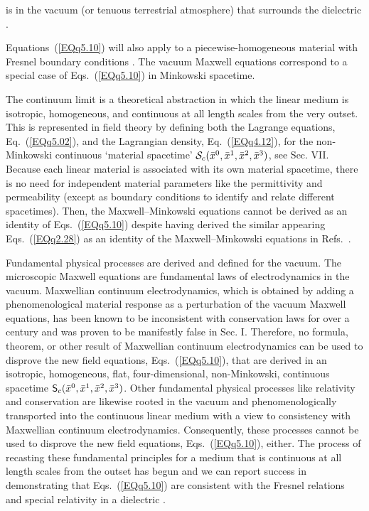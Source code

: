 \documentclass[twocolumn,amssymb,eqsecnum,aps,pra]{revtex4-2}
\begin{document}
is in the vacuum (or tenuous terrestrial atmosphere) that
surrounds the dielectric \cite{BIAJP}.
\par
Equations~(\ref{EQq5.10}) will also apply to a piecewise-homogeneous
material with Fresnel boundary conditions \cite{BINewFres}.
The vacuum Maxwell equations correspond to a special case of
Eqs.~(\ref{EQq5.10}) in Minkowski spacetime.
\par
The continuum limit is a theoretical abstraction in which the linear
medium is isotropic, homogeneous, and continuous at all length scales
from the very outset.
This is represented in field theory by defining both the Lagrange
equations, Eq.~(\ref{EQq5.02}), and the Lagrangian density,
Eq.~(\ref{EQq4.12}), for the non-Minkowski continuous
`material spacetime' ${\cal S}_c(\bar x^0,\bar x^1,\bar x^2,\bar x^3)$,
see Sec. VII.
Because each linear material is associated with its own material 
spacetime, there is no need for independent material parameters
like the permittivity and permeability (except as boundary conditions
to identify and relate different spacetimes).
Then, the Maxwell--Minkowski equations cannot be derived 
as an identity of Eqs.~(\ref{EQq5.10}) despite having derived
the similar appearing Eqs.~(\ref{EQq2.28})
as an identity of the Maxwell--Minkowski equations in
Refs.~\cite{BIIdentity,BIJMP}.
\par
Fundamental physical processes are derived and defined for the vacuum.
The microscopic Maxwell equations are fundamental laws of
electrodynamics in the vacuum.
Maxwellian continuum electrodynamics, which is obtained by adding a
phenomenological material response as a perturbation of the vacuum
Maxwell equations, has been known to be inconsistent with
conservation laws for over a century and was proven to be
manifestly false in Sec. I.
Therefore, no formula, theorem, or other result of Maxwellian continuum
electrodynamics can be used to disprove the new field equations,
Eqs.~(\ref{EQq5.10}), that are derived in an isotropic, homogeneous,
flat, four-dimensional, non-Minkowski, continuous spacetime 
${\sf S}_c(\bar x^0,\bar x^1,\bar x^2,\bar x^3)$.
Other fundamental physical processes like relativity and conservation
are likewise rooted in the vacuum and phenomenologically transported
into the continuous linear medium with a view to consistency with 
Maxwellian continuum electrodynamics.
Consequently, these processes cannot be used to disprove the new
field equations, Eqs.~(\ref{EQq5.10}), either.
The process of recasting these fundamental principles for a
medium that is continuous at all length scales from the outset
has begun and we can report success in demonstrating that
Eqs.~(\ref{EQq5.10}) are consistent with the Fresnel
relations \cite{BINewFres} and special relativity in a
dielectric \cite{BIAJP}.
\par
\end{document}
